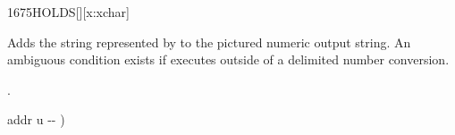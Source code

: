
\begin{worddef}{1675}{HOLDS}[][x:xchar]
\item {}

	Adds the string represented by  to the pictured numeric
	output string.  An ambiguous condition exists if  executes
	outside of a   delimited number conversion.

\see {}.

	\begin{implement}
	\word{:}   addr u -{}- ) \\
	\tab[0.6]      \word{+}
	    \word{;}
	\end{implement}

	\begin{testing}
	\end{testing}
\end{worddef}


